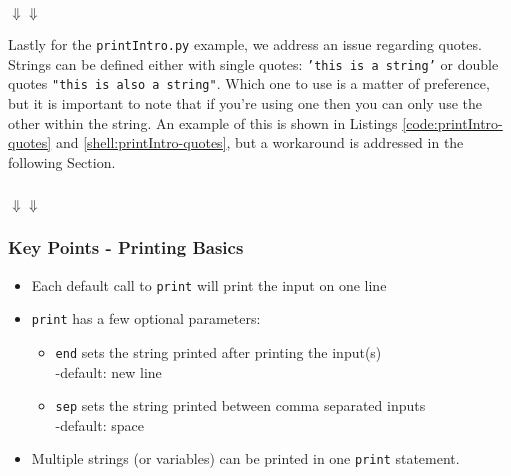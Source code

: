 \documentclass{book}
\newcommand{\pythonSub}[5]{
    \usemintedstyle{autumn}
    \begin{listing}[htb]
        \begin{mdframed}[backgroundcolor=codebg]
            \inputminted[firstline=#2, lastline=#3, linenos]{python}{#1}
        \end{mdframed}
        \caption{#4}
        \label{#5}
    \end{listing}
}
\newcommand{\shellSubH}[5]{
    \begin{listing}[H]
        \begin{mdframed}[backgroundcolor=codebg]
              
        \end{mdframed}
        \caption{#4}
        \label{#5}
    \end{listing}
}
\newcommand{\pythonAndShellSub}[8]{
\usemintedstyle{autumn}
    \begin{listing}[htb]
 	   \begin{mdframed}[backgroundcolor=codebg]
            \inputminted[firstline=#2, lastline=#3, linenos]{python}{#1}
        \end{mdframed}
        \hspace{5em}$\Downarrow$\hfill$\Downarrow$\hspace{5em}
        \begin{mdframed}[backgroundcolor=codebg]
              
        \end{mdframed}
        \caption{#7}
        \label{#8}
    \end{listing}
}
\begin{document}
\pythonAndShellSub{../../../docCode/chapter2/section2/printIntro.py}
{24}{28}
{../../../docCode/chapter2/section2/printIntro.txt}
{14}{18}
{}
{pyshell:printIntro-sep}

Lastly for the \texttt{printIntro.py} example, we address an issue regarding quotes. Strings can be defined either with single quotes: \texttt{'this is a string'} or double quotes \texttt{"this is also a string"}. Which one to use is a matter of preference, but it is important to note that if you're using one then you can only use the other within the string. An example of this is shown in Listings \ref{code:printIntro-quotes} and \ref{shell:printIntro-quotes}, but a workaround is addressed in the following Section.

%
        
\pythonAndShellSub{../../../docCode/chapter2/section2/printIntro.py}
{28}{35}
{../../../docCode/chapter2/section2/printIntro.txt}
{18}{21}
{}
{pyshell:printIntro-quotes}

\subsubsection*{Key Points - Printing Basics}
\begin{itemize}
    \item Each default call to \texttt{print} will print the input on one line
    \item \texttt{print} has a few optional parameters: 
    \begin{itemize}
        \item \texttt{end} sets the string printed after printing the input(s)\\-default: new line
        \item \texttt{sep} sets the string printed between comma separated inputs\\-default: space
    \end{itemize}
    \item Multiple strings (or variables) can be printed in one \texttt{print} statement. 
\end{itemize}
\end{document}
